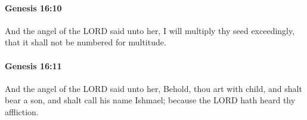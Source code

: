 		\paragraph{Genesis 16:10} %
			\label{GENESIS-16-10}

			And the angel of the LORD said unto her, I will multiply thy seed exceedingly, that it shall not be numbered for multitude.


		\paragraph{Genesis 16:11} %
			\label{GENESIS-16-11}

			And the angel of the LORD said unto her, Behold, thou art with child, and shalt bear a son, and shalt call his name Ishmael; because the LORD hath heard thy affliction.


